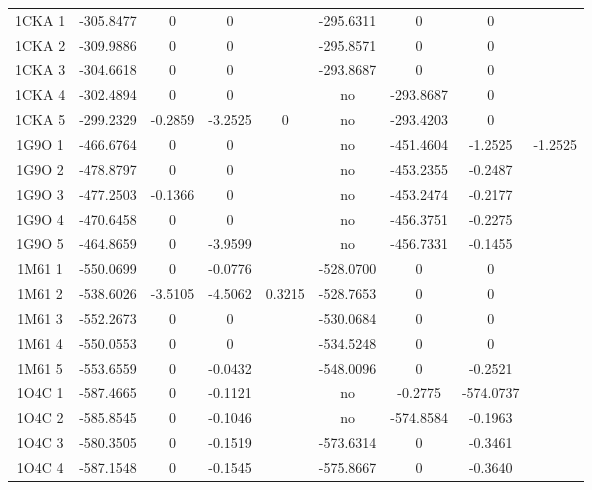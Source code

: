 \documentclass[a4paper,12pt]{article}
\begin{document}
\begin{table}[h]
\begin{tabular}{|c|c|c|c|c|c|c|c|c|}
        1CKA 1 & -305.8477 & 0 & 0 & &                        -295.6311 & 0 & 0 & \\                  
        1CKA 2 & -309.9886 & 0 & 0 & &                        -295.8571 & 0 & 0 & \\                  
        1CKA 3 & -304.6618 & 0 & 0 & &                        -293.8687 & 0 & 0 & \\                  
        1CKA 4 & -302.4894 & 0 & 0 & &                        no & -293.8687 & 0 & \\                 
        1CKA 5 & -299.2329 & -0.2859 & -3.2525 & 0 &          no & -293.4203 & 0 & \\                 
        1G9O 1 & -466.6764 & 0 & 0 & &                        no & -451.4604 & -1.2525 & -1.2525 \\   
        1G9O 2 & -478.8797 & 0 & 0 & &                        no & -453.2355 & -0.2487 & \\           
        1G9O 3 & -477.2503 & -0.1366 & 0 & &                  no & -453.2474 & -0.2177 & \\           
        1G9O 4 & -470.6458 & 0 & 0 & &                        no & -456.3751 & -0.2275 & \\           
        1G9O 5 & -464.8659 & 0 & -3.9599 & &                  no & -456.7331 & -0.1455 & \\           
        1M61 1 & -550.0699 & 0 & -0.0776 & &                  -528.0700 & 0 & 0 & \\                  
        1M61 2 & -538.6026 & -3.5105 & -4.5062 & 0.3215 &     -528.7653 & 0 & 0 & \\                  
        1M61 3 & -552.2673 & 0 & 0 & &                        -530.0684 & 0 & 0 & \\                  
        1M61 4 & -550.0553 & 0 & 0 & &                        -534.5248 & 0 & 0 & \\                  
        1M61 5 & -553.6559 & 0 & -0.0432 & &                  -548.0096 & 0 & -0.2521 & \\            
        1O4C 1 & -587.4665 & 0 & -0.1121 & &                  no & -0.2775 & -574.0737 & \\           
        1O4C 2 & -585.8545 & 0 & -0.1046 & &                  no & -574.8584 & -0.1963 & \\           
        1O4C 3 & -580.3505 & 0 & -0.1519 & &                  -573.6314 & 0 & -0.3461 & \\            
        1O4C 4 & -587.1548 & 0 & -0.1545 & &                  -575.8667 & 0 & -0.3640 & \\            

\end{tabular}
\end{table}
\end{document}
